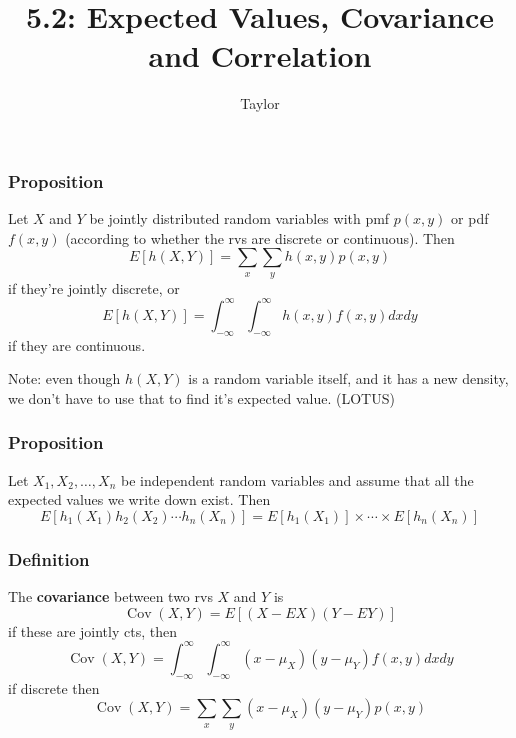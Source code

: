 \documentclass{beamer}
\title["5.2"]{5.2: Expected Values, Covariance and Correlation}
\author{Taylor}
\institute[UVA] 
{
University of Virginia \\
\medskip
\textit{} 
}
\date{}
\begin{document}

\begin{frame}
\titlepage 
\end{frame}

\begin{frame}
\frametitle{Proposition}

Let $X$ and $Y$ be jointly distributed random variables with pmf $p(x,y)$ or pdf $f(x,y)$ (according to whether the rvs are discrete or continuous). Then 
\[
E[h(X,Y)] = \sum_x \sum_y h(x,y)p(x,y)
\]
if they're jointly discrete, or
\[
E[h(X,Y)] = \int_{-\infty}^{\infty} \int_{-\infty}^{\infty} h(x,y) f(x,y) dx dy
\]
if they are continuous.
\newline

Note: even though $h(X,Y)$ is a random variable itself, and it has a new density, we don't have to use that to find it's expected value. (LOTUS)


\end{frame}

\begin{frame}
\frametitle{Proposition}

Let $X_1, X_2, \ldots, X_n$ be independent random variables and assume that all the expected values we write down exist. Then
\[
E[h_1(X_1)h_2(X_2)\cdots h_n(X_n)] = E[h_1(X_1)] \times \cdots \times E[h_n(X_n)]
\]

\end{frame}


\begin{frame}
\frametitle{Definition}

The \textbf{covariance} between two rvs $X$ and $Y$ is 
\[
\operatorname{Cov}(X,Y) = E[(X - EX)(Y - EY)]
\]
if these are jointly cts, then
\[
\operatorname{Cov}(X,Y) = \int_{-\infty}^{\infty}\int_{-\infty}^{\infty} (x - \mu_X)(y - \mu_Y) f(x,y)dx dy
\]
if discrete then 
\[
\operatorname{Cov}(X,Y) = \sum_x \sum_y (x - \mu_X)(y - \mu_Y) p(x,y)
\]

\end{frame}
\end{document}
